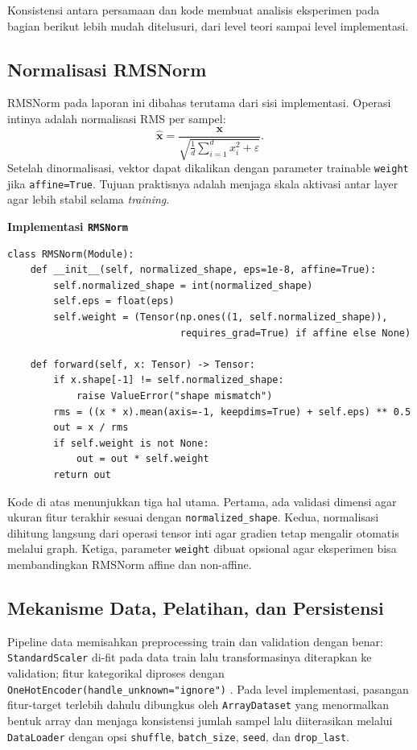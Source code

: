 \documentclass{article}
\begin{document}
Konsistensi antara persamaan dan kode membuat analisis eksperimen pada bagian berikut lebih mudah ditelusuri, dari level teori sampai level implementasi.

\subsection{Normalisasi RMSNorm}
\label{subsec:rmsnorm}
RMSNorm pada laporan ini dibahas terutama dari sisi implementasi. Operasi intinya adalah normalisasi RMS per sampel:
\begin{equation}
\hat{\mathbf{x}}=\frac{\mathbf{x}}{\sqrt{\frac{1}{d}\sum_{i=1}^{d}x_i^2+\varepsilon}}.
\end{equation}
Setelah dinormalisasi, vektor dapat dikalikan dengan parameter trainable \texttt{weight} jika \texttt{affine=True}. Tujuan praktisnya adalah menjaga skala aktivasi antar layer agar lebih stabil selama \textit{training}.

\noindent\textbf{Implementasi \texttt{RMSNorm}}\par
\begin{lstlisting}
class RMSNorm(Module):
    def __init__(self, normalized_shape, eps=1e-8, affine=True):
        self.normalized_shape = int(normalized_shape)
        self.eps = float(eps)
        self.weight = (Tensor(np.ones((1, self.normalized_shape)),
                              requires_grad=True) if affine else None)

    def forward(self, x: Tensor) -> Tensor:
        if x.shape[-1] != self.normalized_shape:
            raise ValueError("shape mismatch")
        rms = ((x * x).mean(axis=-1, keepdims=True) + self.eps) ** 0.5
        out = x / rms
        if self.weight is not None:
            out = out * self.weight
        return out
\end{lstlisting}
Kode di atas menunjukkan tiga hal utama. Pertama, ada validasi dimensi agar ukuran fitur terakhir sesuai dengan \texttt{normalized\_shape}. Kedua, normalisasi dihitung langsung dari operasi tensor inti agar gradien tetap mengalir otomatis melalui graph. Ketiga, parameter \texttt{weight} dibuat opsional agar eksperimen bisa membandingkan RMSNorm affine dan non-affine.

\subsection{Mekanisme Data, Pelatihan, dan Persistensi}
\label{subsec:data}
Pipeline data memisahkan preprocessing train dan validation dengan benar: \texttt{StandardScaler} di-fit pada data train lalu transformasinya diterapkan ke validation; fitur kategorikal diproses dengan \texttt{OneHotEncoder(handle\_unknown="ignore")} \citep{sklearn_standardscaler,sklearn_onehotencoder,pedregosa2011sklearn}. Pada level implementasi, pasangan fitur-target terlebih dahulu dibungkus oleh \texttt{ArrayDataset} yang menormalkan bentuk array dan menjaga konsistensi jumlah sampel lalu diiterasikan melalui \texttt{DataLoader} dengan opsi \texttt{shuffle}, \texttt{batch\_size}, \texttt{seed}, dan \texttt{drop\_last}.
\end{document}
